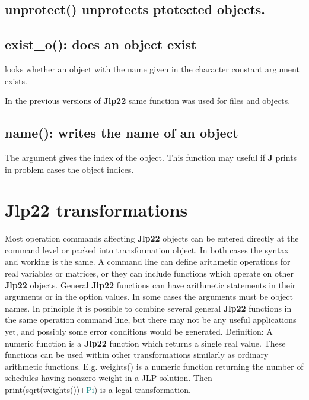 {\subsection{\textcolor{VioletRed}{unprotect}() unprotects ptotected objects.} 
\label{unprotect} 
 
\subsection{\textcolor{VioletRed}{exist\_o}(): does an object exist} 
\label{existo} 
looks whether an object with the name given in 
the character constant  argument exists. 
\begin{note} 
In the previous versions of \textbf{Jlp22} same function was used for files and objects. 
\end{note} 
\subsection{\textcolor{VioletRed}{name}(): writes the name of an object} 
\label{name} 
The argument gives the index of the object. This function 
may useful if \textbf{J} prints in problem cases the object indices. 
\section{\textbf{Jlp22} transformations} 
\label{jtrans} 
Most operation commands affecting \textbf{Jlp22} objects can be entered directly at the command level or 
packed into transformation object. In both cases the syntax and working is the same. A 
command line can define arithmetic operations for real variables or matrices, or they can 
include functions which operate on other \textbf{Jlp22} objects. General \textbf{Jlp22} functions can have arithmetic 
statements in their arguments or in the option values. In some cases the arguments must be 
object names. In principle it is possible to combine several general \textbf{Jlp22} functions in the same 
operation command line, but there may not be any useful applications yet, and possibly some 
error conditions would be generated. 
Definition: A numeric function is a \textbf{Jlp22} function which returns a single real value. These functions 
can be used within other transformations similarly as ordinary arithmetic functions. E.g. 
\textcolor{VioletRed}{weights}() is a numeric function returning the number of schedules having nonzero weight 
in a JLP-solution. Then \textcolor{VioletRed}{print}(\textcolor{VioletRed}{sqrt}(\textcolor{VioletRed}{weights}())+\textcolor{teal}{Pi}) is a legal transformation. 
}

